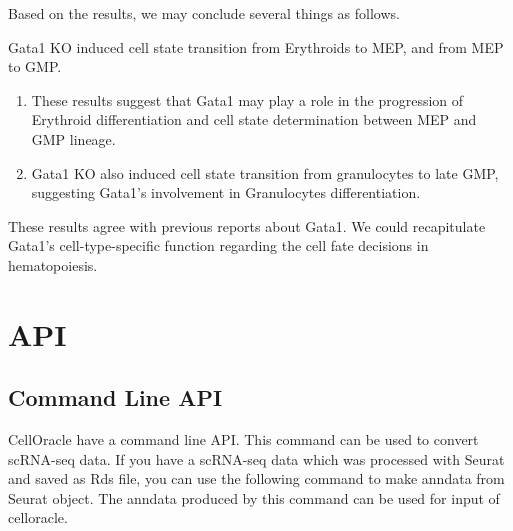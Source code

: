 \documentclass[letterpaper,10pt,english]{sphinxmanual}
\begin{document}
Based on the results, we may conclude several things as follows.

Gata1 KO induced cell state transition from Erythroids to MEP, and from MEP to GMP.
\begin{enumerate}
\item {} 
These results suggest that Gata1 may play a role in the progression of Erythroid differentiation and cell state determination between MEP and GMP lineage.

\item {} 
Gata1 KO also induced cell state transition from granulocytes to late GMP, suggesting Gata1’s involvement in Granulocytes differentiation.

\end{enumerate}

These results agree with previous reports about Gata1. We could recapitulate Gata1’s cell-type-specific function regarding the cell fate decisions in hematopoiesis.

{
%
\begin{sphinxVerbatim}[commandchars=\\\{\}]
\llap{\color{nbsphinxin}[ ]:\,\hspace{\fboxrule}\hspace{\fboxsep}}
\end{sphinxVerbatim}
}


\section{API}
\label{\detokenize{modules/index:api}}\label{\detokenize{modules/index::doc}}

\subsection{Command Line API}
\label{\detokenize{modules/index:command-line-api}}
CellOracle have a command line API.
This command can be used to convert scRNA-seq data.
If you have a scRNA-seq data which was processed with Seurat and saved as Rds file, you can use the following command to make anndata from Seurat object.
The anndata produced by this command can be used for input of celloracle.

%
\begin{sphinxVerbatim}[commandchars=\\\{\}]
  
\end{sphinxVerbatim}
\end{document}
